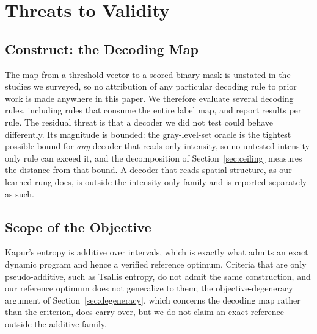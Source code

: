 \section{Threats to Validity}
\label{sec:threats}

\subsection{Construct: the Decoding Map}

The map from a threshold vector to a scored binary mask is unstated in the
studies we surveyed, so no attribution of any particular decoding rule to prior
work is made anywhere in this paper.
We therefore evaluate several decoding rules, including rules that consume the
entire label map, and report results per rule. The residual threat is that a
decoder we did not test could behave differently. Its magnitude is bounded: the
gray-level-set oracle is the tightest possible bound for \emph{any} decoder that
reads only intensity, so no untested intensity-only rule can exceed it, and the
decomposition of Section~\ref{sec:ceiling} measures the distance from that bound.
A decoder that reads spatial structure, as our learned rung does, is outside the
intensity-only family and is reported separately as such.

\subsection{Scope of the Objective}

Kapur's entropy is additive over intervals, which is exactly what admits an exact
dynamic program and hence a verified reference optimum. Criteria that are only
pseudo-additive, such as Tsallis entropy, do not admit the same construction, and
our reference optimum does not generalize to them; the objective-degeneracy
argument of Section~\ref{sec:degeneracy}, which concerns the decoding map rather
than the criterion, does carry over, but we do not claim an exact reference
outside the additive family.

